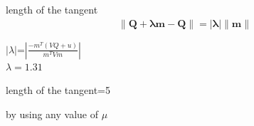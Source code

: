 \documentclass[journal,10pt,twocolumn]{article}
\let\vec\mathbf
\begin{document}
length of the tangent
\begin{align}
\vec{\lVert Q +\lambda m-Q\rVert=  |\lambda| \lVert m\rVert}
\end{align}

\begin{center}
$|\lambda|$=$|\frac{-m^T(VQ+u)}{m^TVm}|$\\
$\lambda=1.31$
\end{center}










length of the tangent=5

by using any value of $\mu$










































 
\end{document}
